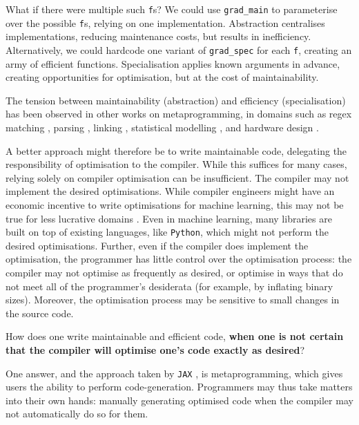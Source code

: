What if there were multiple such \texttt{f}s? We could use \texttt{grad_main} to parameterise over the possible \texttt{f}s, relying on one implementation. Abstraction centralises implementations, reducing maintenance costs, but results in inefficiency. Alternatively, we could hardcode one variant of \texttt{grad_spec} for each \texttt{f}, creating an army of efficient functions. Specialisation applies known arguments in advance, creating opportunities for optimisation, but at the cost of maintainability. 

The tension between maintainability (abstraction) and efficiency (specialisation) has been observed in other works on metaprogramming, in domains such as regex matching \citep{tratt-2008}, parsing \citep{yallop-2023}, linking \citep{servetto-2013}, statistical modelling \citep{wickham-2019}, and hardware design \citep{vandebon-2021}.

A better approach might therefore be to write maintainable code, delegating the responsibility of optimisation to the compiler. While this suffices for many cases, relying solely on compiler optimisation can be insufficient. The compiler may not implement the desired optimisations. While compiler engineers might have an economic incentive to write optimisations for machine learning, this may not be true for less lucrative domains \citep{robinson-01}. Even in machine learning, many libraries are built on top of existing languages, like \texttt{Python}, which might not perform the desired optimisations. Further, even if the compiler does implement the optimisation, the programmer has little control over the optimisation process: the compiler may not optimise as frequently as desired, or optimise in ways that do not meet all of the programmer's desiderata (for example, by inflating binary sizes). Moreover, the optimisation process may be sensitive to small changes in the source code.

How does one write maintainable and efficient code, \textbf{when one is not certain that the compiler will optimise one's code exactly as desired}?

One answer, and the approach taken by \texttt{JAX} \citep{jax-grad-metaprogramming}, is metaprogramming, which gives users the ability to perform code-generation. Programmers may thus take matters into their own hands: manually generating optimised code when the compiler may not automatically do so for them. 

